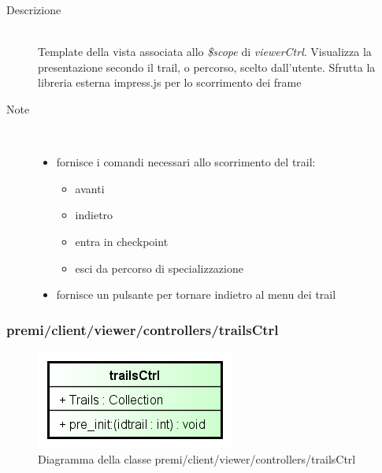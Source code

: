 \begin{description}
\item[Descrizione] \hfill \\
	Template della vista associata allo \textit{\$scope} di \textit{viewerCtrl}. Visualizza la presentazione secondo il trail, o percorso, scelto dall'utente. Sfrutta la libreria esterna impress.js per lo scorrimento dei frame
\item[Note] \hfill \\
	\begin{itemize}
			\item fornisce i comandi necessari allo scorrimento del trail:
				\begin{itemize}
					\item avanti
					\item indietro
					\item entra in checkpoint
					\item esci da percorso di specializzazione
				\end{itemize}
			\item fornisce un pulsante per tornare indietro al menu dei trail
	\end{itemize}
\end{description}











\subsubsection{premi/client/viewer/controllers/trailsCtrl}
\begin{figure}[h]
\begin{center}
\includegraphics[scale=0.55]{img/diacla/trailsCtrl.png}
\caption{Diagramma della classe premi/client/viewer/controllers/trailsCtrl}
\end{center}
\end{figure}


